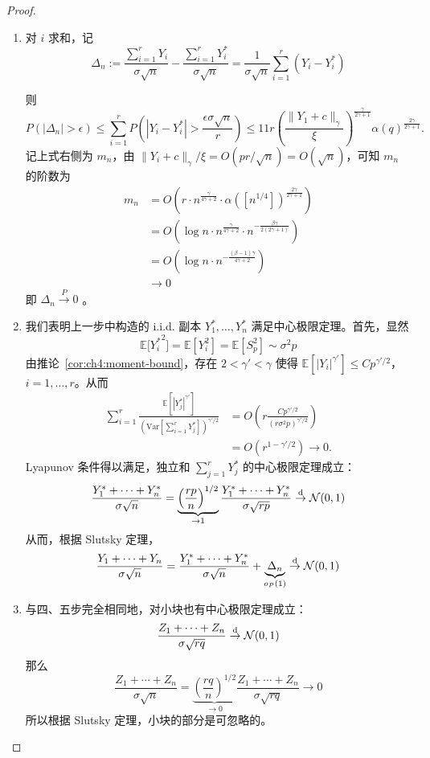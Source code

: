\begin{proof}
\begin{enumerate}[label=\textbf{第\chinese*步}:, leftmargin=4em]
由此得到了 i.i.d. 的 $Y_1^*,\dots,Y_r^*$ ，且\[ P\left( |Y_i - Y^*_i| > \frac{\epsilon \sigma \sqrt{n}}{r} \right) \leq 11 \left( \frac{\|Y_i + c\|_\gamma}{\xi} \right)^{\frac{\gamma}{2\gamma+1}} \alpha(q)^{\frac{2\gamma}{2\gamma+1}} \] 

\item 对 $i$ 求和，记\[ \Delta_n := \frac{\sum_{i=1}^r Y_i}{\sigma \sqrt{n}} - \frac{\sum_{i=1}^r Y^*_i}{\sigma \sqrt{n}} = \frac{1}{\sigma\sqrt{n}} \sum_{i=1}^r (Y_i - Y^*_i) \]

则
\[P(|\Delta_n| > \epsilon) \leq \sum_{i=1}^r P\left( |Y_i - Y^*_i| > \frac{\epsilon \sigma \sqrt{n}}{r} \right) \leq 11 r \left( \frac{\|Y_1 + c\|_\gamma}{\xi} \right)^{\frac{\gamma}{2\gamma+1}} \alpha(q)^{\frac{2\gamma}{2\gamma+1}}.\]
记上式右侧为 $m_n$，由 $\|Y_i+c\|_\gamma/\xi=O(pr/\sqrt n)=O(\sqrt n)$，可知 $m_n$ 的阶数为
\[\begin{aligned}m_n &= O\left( r \cdot n^{\frac{\gamma}{4\gamma+2}} \cdot \alpha([n^{1/4}])^{\frac{2\gamma}{2\gamma+1}} \right)\\ &= O\left( \log n\cdot n^{\frac{\gamma}{4\gamma+2}} \cdot n^{-\frac{\beta \gamma}{2(2\gamma+1)}} \right)\\ &=O\left(\log n\cdot n^{-\frac{(\beta-1)\gamma}{4\gamma+2}}\right)\\ &\to 0 \end{aligned}\]
即 $\Delta_n\overset{P}\to 0$ 。

\item 我们表明上一步中构造的 i.i.d. 副本 $Y_1^*,\dots,Y_n^*$ 满足中心极限定理。首先，显然 \[ \mathbb{E}\big[{Y^*_i}^2\big]=\mathbb{E}[Y_i^2]=\mathbb{E}[S_p^2]\sim \sigma^2p \]由推论~\ref{cor:ch4:moment-bound}，存在 $2<\gamma'<\gamma$ 使得 $\mathbb{E}[|Y_i|^{\gamma'}]\le Cp^{\gamma'/2}$，$i=1,\dots,r$。从而
\[
\begin{aligned}
\sum_{i=1}^r
\frac{\mathbb E[|Y^*_j|^{\gamma'}]}
{\left(\mathrm{Var}\left[\sum_{i=1}^rY^*_j\right]\right)^{\gamma'/2}}
&=O\left(r\frac{Cp^{\gamma'/2}}{(r\sigma^2p)^{\gamma'/2}}\right)\\
&=O\left(r^{1-\gamma'/2}\right)\to 0.
\end{aligned}
\]
Lyapunov 条件得以满足，独立和 $\sum_{j=1}^r Y_j^*$ 的中心极限定理成立：
\[\frac{Y_1^*+\cdots+Y_n^*}{\sigma\sqrt n}=\underbrace{\left(\frac{rp}{n}\right)^{1/2}}_{\to 1}\frac{Y_1^*+\cdots+Y_n^*}{\sigma\sqrt{rp}}\overset{\rm d}\to \mathcal N(0,1)\]
从而，根据 Slutsky 定理， \[ \frac{Y_1+\cdots+Y_n}{\sigma\sqrt n}=\frac{Y_1^*+\cdots+Y_n^*}{\sigma\sqrt n}+\underbrace{\Delta_n}_{o_P(1)}\overset{\rm d}\to\mathcal N(0,1) \]
\item 与四、五步完全相同地，对小块也有中心极限定理成立： \[ \frac{Z_1+\cdots+Z_n}{\sigma\sqrt{rq}}\overset{\rm d}\to \mathcal N(0,1) \]那么 \[ \frac{Z_1+\cdots+Z_n}{\sigma\sqrt{n}}=\underbrace{\left(\frac{rq}{n}\right)^{1/2}}_{\to 0}\frac{Z_1+\cdots+Z_n}{\sigma\sqrt{rq}}\to 0 \]所以根据 Slutsky 定理，小块的部分是可忽略的。


\end{enumerate}
\end{proof}
